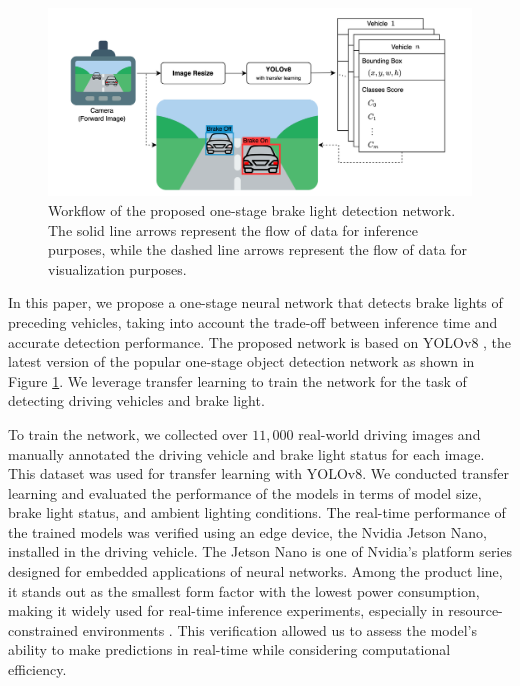 \begin{figure}[]
    \includegraphics[scale=0.5]{fig/workflow.png}
    \caption{Workflow of the proposed one-stage brake light detection network. The solid line arrows represent the flow of data for inference purposes, while the dashed line arrows represent the flow of data for visualization purposes.}
    \label{fig:workflow}
\end{figure}

In this paper, we propose a one-stage neural network that detects brake lights of preceding vehicles, taking into account the trade-off between inference time and accurate detection performance. 
The proposed network is based on YOLOv8 \cite{YOLOv8}, the latest version of the popular one-stage object detection network as shown in Figure \ref{fig:workflow}.
We leverage transfer learning to train the network for the task of detecting driving vehicles and brake light.

To train the network, we collected over $11,000$ real-world driving images and manually annotated the driving vehicle and brake light status for each image.
This dataset was used for transfer learning with YOLOv8. 
We conducted transfer learning and evaluated the performance of the models in terms of model size, brake light status, and ambient lighting conditions.
The real-time performance of the trained models was verified using an edge device, the Nvidia Jetson Nano, installed in the driving vehicle.
The Jetson Nano is one of Nvidia's platform series designed for embedded applications of neural networks.
Among the product line, it stands out as the smallest form factor with the lowest power consumption, making it widely used for real-time inference experiments, especially in resource-constrained environments \cite{assunccao2022real}.
This verification allowed us to assess the model's ability to make predictions in real-time while considering computational efficiency.

